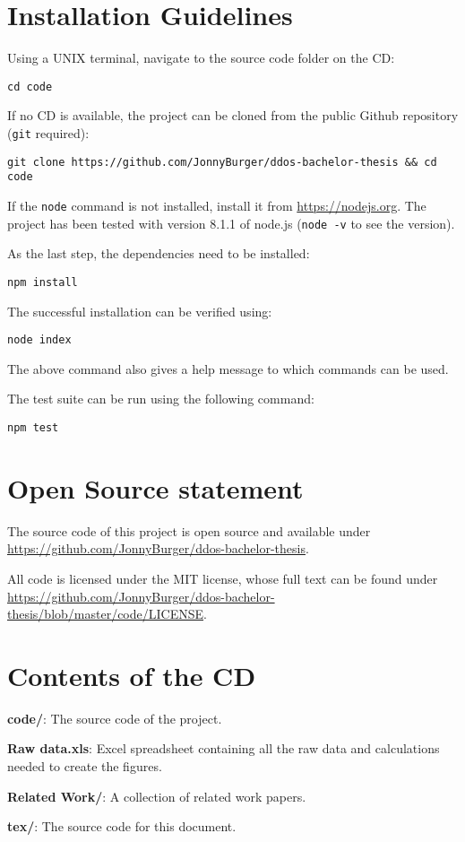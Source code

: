 \appendix

\chapter{Installation Guidelines}

Using a UNIX terminal, navigate to the source code folder on the CD:

\texttt{cd code}

If no CD is available, the project can be cloned from the public Github repository (\texttt{git} required):

\texttt{git clone https://github.com/JonnyBurger/ddos-bachelor-thesis \&\& cd code}

If the  \texttt{node} command is not installed, install it from \url{https://nodejs.org}. The project has been tested with version 8.1.1 of node.js (\texttt{node -v} to see the version).

As the last step, the dependencies need to be installed:

\texttt{npm install}

The successful installation can be verified using:

\texttt{node index}

The above command also gives a help message to which commands can be used.

The test suite can be run using the following command:

\texttt{npm test}

\chapter{Open Source statement}

The source code of this project is open source and available under \url{https://github.com/JonnyBurger/ddos-bachelor-thesis}.

All code is licensed under the MIT license, whose full text can be found under \url{https://github.com/JonnyBurger/ddos-bachelor-thesis/blob/master/code/LICENSE}.

\chapter{Contents of the CD}

\textbf{code/}: The source code of the project.

\textbf{Raw data.xls}: Excel spreadsheet containing all the raw data and calculations needed to create the figures.

\textbf{Related Work/}: A collection of related work papers.

\textbf{tex/}: The source code for this document.
